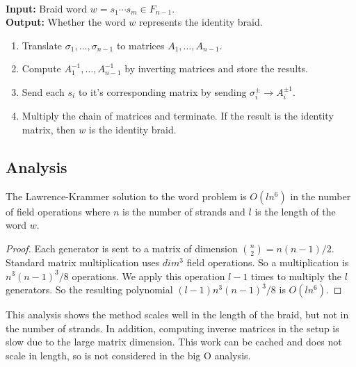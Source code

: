 \documentclass[12pt]{thesis}
\begin{document}
\begin{algorithm}

    ~\\
    \textbf{Input:} Braid word $w = s_{1} \cdots s_{m} \in F_{n-1}$. ~\\
    \textbf{Output:} Whether the word $w$ represents the identity braid. 

\begin{enumerate}
    \item Translate $\sigma_{1}, \dots, \sigma_{n-1}$
            to matrices $A_{1}, \ldots, A_{n-1}$.

    \item Compute $A_{1}^{-1}, \ldots, A_{n-1}^{-1}$ by inverting matrices and store the results.

    \item Send each $s_{i}$ to it's corresponding matrix
        by sending $\sigma_{i}^{\pm} \rightarrow A_{i}^{\pm 1}$.

    \item Multiply the chain of matrices and terminate.
          If the result is the identity matrix, then $w$ is the identity braid.
\end{enumerate}

\end{algorithm}

\subsection{Analysis}

\begin{proposition}
    \label{prop:lk-runtime}
    The Lawrence-Krammer solution to the word problem
    is $O(ln^{6})$ in the number of field operations where $n$ is the number
    of strands and $l$ is the length of the word $w$.
\end{proposition}

\begin{proof}
    Each generator is sent to a matrix of dimension ${ n \choose 2 } = n(n-1)/2$.
    Standard matrix multiplication uses $dim^{3}$ field operations.
    So a multiplication is $n^{3}(n-1)^{3}/8$ operations.
    We apply this operation $l-1$ times to multiply the $l$ generators.
    So the resulting polynomial $(l -1) n^{3}(n-1)^{3}/8$ is $O(ln^{6})$.
\end{proof}

This analysis shows the method scales well in the length of the braid,
but not in the number of strands.
In addition, computing inverse
matrices in the setup is slow due to the large matrix dimension.
This work can be cached and does not scale in length,
so is not considered in the big O analysis.
\end{document}
